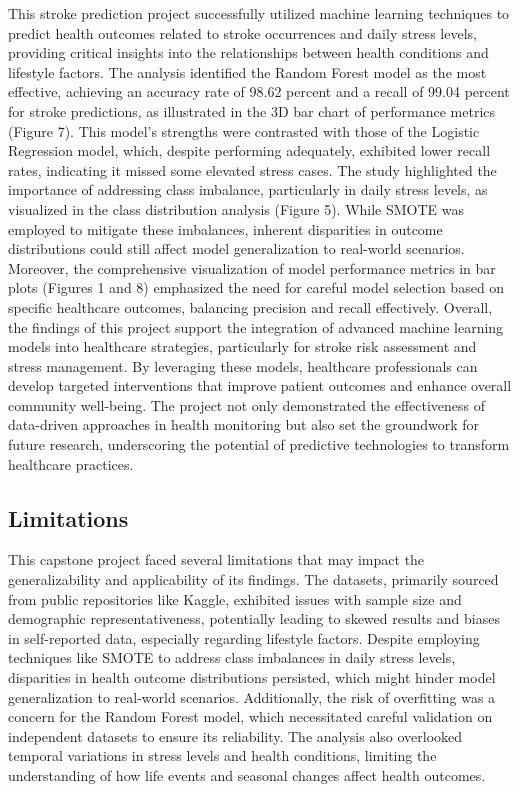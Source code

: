 \documentclass[runningheads]{llncs}
\begin{document}
\begin{enumerate}
This stroke prediction project successfully utilized machine learning techniques to predict health outcomes related to stroke occurrences and daily stress levels, providing critical insights into the relationships between health conditions and lifestyle factors. The analysis identified the Random Forest model as the most effective, achieving an accuracy rate of 98.62 percent and a recall of 99.04 percent for stroke predictions, as illustrated in the 3D bar chart of performance metrics (Figure 7). This model's strengths were contrasted with those of the Logistic Regression model, which, despite performing adequately, exhibited lower recall rates, indicating it missed some elevated stress cases. The study highlighted the importance of addressing class imbalance, particularly in daily stress levels, as visualized in the class distribution analysis (Figure 5). While SMOTE was employed to mitigate these imbalances, inherent disparities in outcome distributions could still affect model generalization to real-world scenarios. Moreover, the comprehensive visualization of model performance metrics in bar plots (Figures 1 and 8) emphasized the need for careful model selection based on specific healthcare outcomes, balancing precision and recall effectively. Overall, the findings of this project support the integration of advanced machine learning models into healthcare strategies, particularly for stroke risk assessment and stress management. By leveraging these models, healthcare professionals can develop targeted interventions that improve patient outcomes and enhance overall community well-being. The project not only demonstrated the effectiveness of data-driven approaches in health monitoring but also set the groundwork for future research, underscoring the potential of predictive technologies to transform healthcare practices.

\subsection{Limitations}

This capstone project faced several limitations that may impact the generalizability and applicability of its findings. The datasets, primarily sourced from public repositories like Kaggle, exhibited issues with sample size and demographic representativeness, potentially leading to skewed results and biases in self-reported data, especially regarding lifestyle factors. Despite employing techniques like SMOTE to address class imbalances in daily stress levels, disparities in health outcome distributions persisted, which might hinder model generalization to real-world scenarios. Additionally, the risk of overfitting was a concern for the Random Forest model, which necessitated careful validation on independent datasets to ensure its reliability. The analysis also overlooked temporal variations in stress levels and health conditions, limiting the understanding of how life events and seasonal changes affect health outcomes. 


\end{enumerate}
\end{document}
